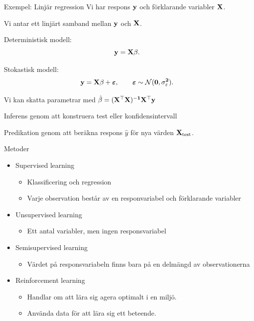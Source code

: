 \documentclass[10pt,english]{beamer}
\begin{document}
\begin{frame}{Exempel: Linjär regression}
    Vi har respons $\bf{y}$ och förklarande variabler $\bf{X}$.

    Vi antar ett linjärt samband mellan $\bf{y}$ och $\bf{X}$.

    Deterministisk modell:
    \begin{equation*}
        \bf{y} = \bf{X} \beta.
    \end{equation*}

    Stokastisk modell:
    \begin{equation*}
        \bf{y} = \bf{X} \beta + \boldsymbol{\varepsilon}, \qquad \boldsymbol{\varepsilon} \sim \mathcal{N}(0, \sigma^2_{\varepsilon}).
    \end{equation*}

    Vi kan skatta parametrar med $\hat{\beta} = (\bf{X}^\top \bf{X})^{-1}\bf{X}^{\top} \bf{y}$

    Inferens genom att konstruera test eller konfidensintervall

    Predikation genom att beräkna respons $\hat{y}$ för nya värden $\bf{X}_{\text{test}}$.
\end{frame}


\begin{frame}{Metoder}
    \begin{itemize}
        \item Supervised learning
        \begin{itemize}
            \item Klassificering och regression
            \item Varje observation består av en responvariabel och förklarande variabler
        \end{itemize}
        \item Unsupervised learning
        \begin{itemize}
            \item Ett antal variabler, men ingen responsvariabel
        \end{itemize}
        \item Semisupervised learning
        \begin{itemize}
            \item Värdet på responsvariabeln finns bara på en delmängd av observationerna
        \end{itemize}
        \item Reinforcement learning
        \begin{itemize}
            \item Handlar om att lära sig agera optimalt i en miljö.
            \item Använda data för att lära sig ett beteende.
        \end{itemize}
    \end{itemize}
\end{frame}
\end{document}
